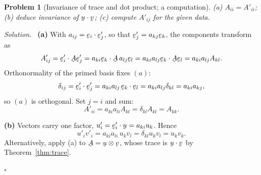 \documentclass[17pt,a4paper]{extreport}
\DeclareRobustCommand{\vek}[1]{\underaccent{\tilde}{#1}}
\newcommand{\bu}{\vek{u}}
\newcommand{\bv}{\vek{v}}
\newcommand{\be}{\vek{e}}
\newcommand{\bA}{\vek{A}}
\newcommand{\dd}{\delta}
\newcommand{\ip}[2]{#1\cdot#2}
\theoremstyle{scplain}
\theoremstyle{scdefn}
\theoremstyle{scplain}
\newtheorem{problem}{Problem}
\newenvironment{solution}
 {\par\smallskip\noindent\textit{Solution.}\ }
 {\hfill$\square$\par\medskip}
\begin{document}
\begin{problem}[Invariance of trace and dot product; a computation]
(a) $A_{ii}=A'_{ii}$; (b) deduce invariance of $\ip\bu\bv$; (c) compute
$A'_{ij}$ for the given data.
\end{problem}
\begin{solution}
\textbf{(a)} With $a_{ij}=\ip{\be_i}{\be'_j}$, so that
$\be'_j=a_{kj}\be_k$, the components transform as
\[
   A'_{ij}=\ip{\be'_i}{\bA\be'_j}
   =\ip{a_{ki}\be_k}{\bA\,a_{lj}\be_l}
   =a_{ki}a_{lj}\ip{\be_k}{\bA\be_l}
   =a_{ki}a_{lj}A_{kl}.
\]
Orthonormality of the primed basis fixes $(a)$:
\[
   \dd_{ij}=\ip{\be'_i}{\be'_j}=a_{ki}a_{lj}\,\ip{\be_k}{\be_l}
   =a_{ki}a_{lj}\dd_{kl}=a_{ki}a_{kj},
\]
so $(a)$ is orthogonal. Set $j=i$ and sum:
\[
   A'_{ii}=a_{ki}a_{li}A_{kl}=\dd_{kl}A_{kl}=A_{kk}.
\]

\textbf{(b)} Vectors carry one factor, $u'_i=\ip{\be'_i}{\bu}
=a_{ki}u_k$. Hence
\[
   u'_iv'_i=a_{ki}a_{li}\,u_kv_l=\dd_{kl}u_kv_l=u_kv_k .
\]
Alternatively, apply (a) to $\bA=\bu\otimes\bv$, whose trace is
$\ip\bu\bv$ by Theorem~\ref{thm:trace}.


\end{solution}
\end{document}
